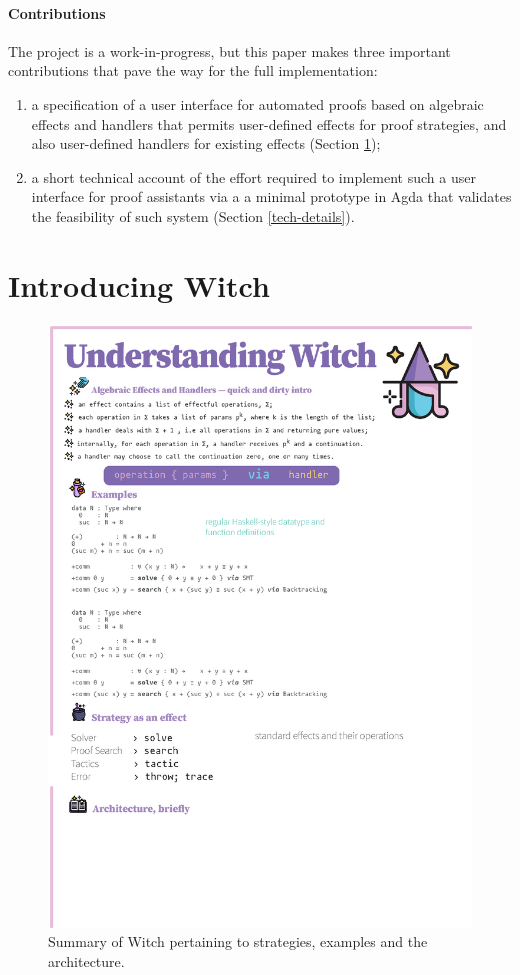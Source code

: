 \documentclass[sigconfl]{acmart}
\begin{document}
\paragraph{Contributions} The project is a work-in-progress, but this paper
makes three important contributions that pave the way for the full implementation:
\begin{enumerate}
\item a specification of a user interface for automated proofs based on
  algebraic effects and handlers that permits user-defined effects for proof
  strategies, and also user-defined handlers for existing effects (Section \ref{intro-witch});
\item a short technical account of the effort required to implement such a
  user interface for proof assistants via a a minimal prototype in Agda that
  validates the feasibility of such system  (Section \ref{tech-details}).
\end{enumerate}

\section{Introducing Witch} \label{intro-witch}

\begin{figure}[!ht]
   \centering
    \includegraphics[height=\textheight]{image/witch.eps}
    \caption{Summary of Witch pertaining to strategies, examples
      and the architecture.}
    \label{fig:prototype}
\end{figure}
\end{document}
